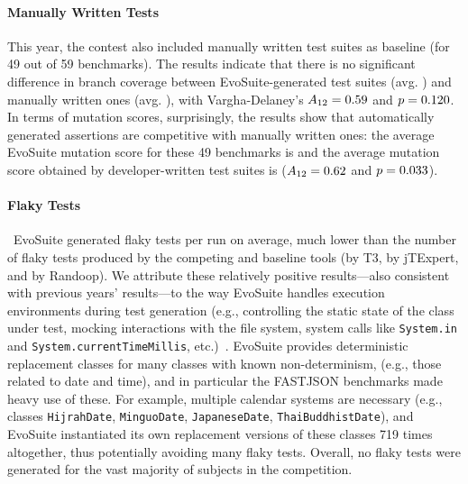 \documentclass[sigconf,table]{acmart}
\newcommand{\EVOSUITE}{{\sc EvoSuite}\xspace}
\newcommand{\JTEXPERT}{{\sc jTExpert}\xspace}
\newcommand{\RANDOOP}{{\sc Randoop}\xspace}
\newcommand{\TT}{{\sc T3}\xspace}
\begin{document}
\paragraph{Manually Written Tests}

This year, the contest also included manually written test suites as
baseline (for 49 out of 59 benchmarks). The results indicate that
there is no significant difference in branch coverage between
\EVOSUITE-generated test suites (avg. \AvgCovEvosuite) and manually
written ones (avg. \AvgCovManual), with Vargha-Delaney's
$A_{12}={0.59}$ and $p={{0.120}}$. In terms of mutation
scores, surprisingly, the results show that automatically generated
assertions are competitive with manually written ones: the average
\EVOSUITE mutation score for these 49 benchmarks is \AvgMutEvosuite
and the average mutation score obtained by developer-written test
suites is \AvgMutManual ($A_{12}={0.62}$ and
$p={{0.033}}$).



\paragraph{Flaky Tests}

~\EVOSUITE generated \FlakyEvosuite flaky tests per run on average,
much lower than the number of flaky tests produced by the competing
and baseline tools (\FlakyTthree by \TT, \FlakyJtexpert by \JTEXPERT,
and \FlakyRandoop by \RANDOOP). We attribute these relatively positive
results---also consistent with previous years' results---to the way
\EVOSUITE handles execution environments during test generation (e.g.,
controlling the static state of the class under test, mocking
interactions with the file system, system calls like
\texttt{System.in} and \texttt{System.currentTimeMillis},
etc.)~\cite{arcuri2014automated}.  \EVOSUITE provides deterministic
replacement classes for many classes with known non-determinism,
(e.g., those related to date and time), and in particular the FASTJSON
benchmarks made heavy use of these. For example, multiple calendar
systems are necessary (e.g., classes \texttt{HijrahDate},
\texttt{MinguoDate}, \texttt{JapaneseDate},
\texttt{ThaiBuddhistDate}), and \EVOSUITE instantiated its own
replacement versions of these classes 719 times altogether, thus
potentially avoiding many flaky tests. Overall, no flaky tests were
generated for the vast majority of subjects in the competition.
\end{document}
